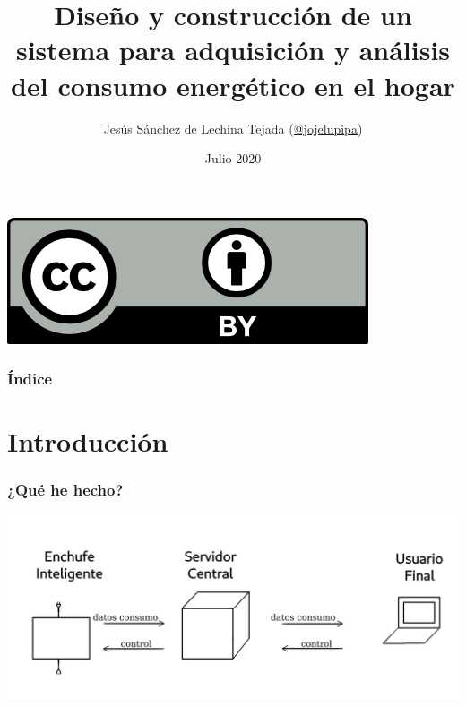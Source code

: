 \documentclass[compress, aspectratio=169]{beamer} %
\title[smart-plug]{Diseño y construcción de un sistema para adquisición y análisis del consumo energético en el hogar} %
\author[Jesús Sánchez de LechinaTejada]{
	Jesús Sánchez de Lechina Tejada
	(\href{http://www.github.com/jojelupipa}{@jojelupipa})\\ 
} %
\institute[UGR] %
{
  Universidad de Granada \\ %
}
\date{Julio 2020} %
\begin{document}
\begin{frame}
	\transdissolve[duration=1]

	\titlepage %
        \centering \includegraphics[scale=0.3]{img/by.png}
\end{frame}


 
\begin{frame}
  \transdissolve[duration=1]
  \tableofcontents[]
  \frametitle{Índice}
\end{frame}


\section{Introducción}
	\begin{frame}
	  \transdissolve[duration=1]
	  \frametitle{\insertsection}
	\end{frame}

        \begin{frame}
          \transdissolve[duration=1]
          \frametitle{¿Qué he hecho?}

          \includegraphics{img/esquema_basico_sistema.png}
          
          
        \end{frame}
\end{document}
